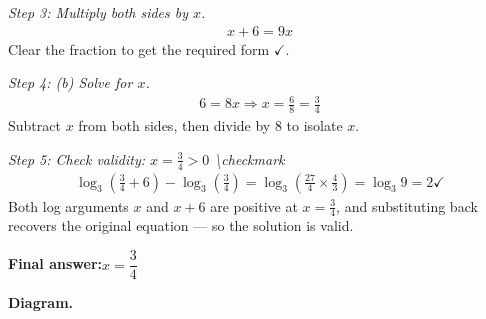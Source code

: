 \documentclass[11pt]{article}
\begin{document}
\textit{Step 3: Multiply both sides by \( x \).}
\[\begin{gathered}
x + 6 = 9x
\end{gathered}\]
Clear the fraction to get the required form $\checkmark$.

\textit{Step 4: (b) Solve for \( x \).}
\[\begin{gathered}
6 = 8x \Rightarrow x = \frac{6}{8} = \frac{3}{4}
\end{gathered}\]
Subtract \( x \) from both sides, then divide by 8 to isolate \( x \).

\textit{Step 5: Check validity: \( x = \frac{3}{4} > 0 \) \textbackslash checkmark}
\[\begin{gathered}
\log_3\!\left(\frac{3}{4} + 6\right) - \log_3\!\left(\frac{3}{4}\right) = \log_3\!\left(\frac{27}{4} \times \frac{4}{3}\right) = \log_3 9 = 2 \checkmark
\end{gathered}\]
Both log arguments \( x \) and \( x+6 \) are positive at \( x = \tfrac{3}{4} \), and substituting back recovers the original equation --- so the solution is valid.

\begin{answerbox}
\textbf{Final answer:}\quad \(\displaystyle  x = \dfrac{3}{4} \)
\end{answerbox}
\textbf{Diagram.}
\end{document}

